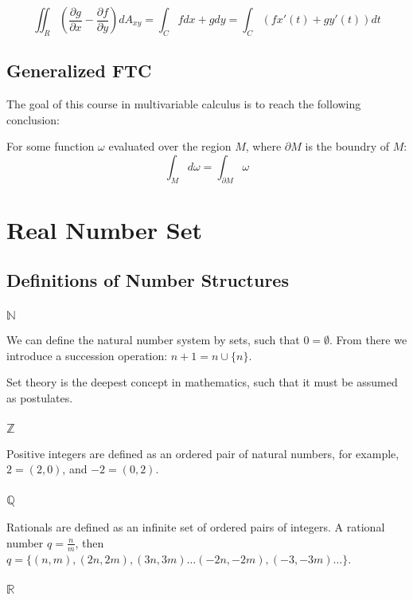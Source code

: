\documentclass[11 pt, twoside]{article}
\begin{document}
$$\iint_R (\frac{\partial g}{\partial x} - \frac{\partial f}{\partial y}) dA_{xy} =
\int_C fdx + gdy = \int_C (fx'(t) + gy'(t))dt$$

\subsection{Generalized FTC}

The goal of this course in multivariable calculus is to reach the following
conclusion:

For some function $\omega$ evaluated over the region $M$, where $\partial M$ is the boundry of $M$:
$$\int_M d\omega = \int_{\partial M} \omega$$

\section{Real Number Set}
\subsection{Definitions of Number Structures}
\subsubsection{$\mathbb{N}$}
We can define the natural number system by sets, such that $0 = \emptyset$.
From there we introduce a succession operation:
$n + 1 = n \cup \{n\}$.

\noindent Set theory is the deepest concept in mathematics, such that it must be assumed as postulates.

\subsubsection{$\mathbb{Z}$}
Positive integers are defined as an ordered pair of natural numbers, for
example, $2 = (2, 0)$, and $-2 = (0, 2)$.

\subsubsection{$\mathbb{Q}$}
Rationals are defined as an infinite set of ordered pairs of integers.
A rational number $q = \frac{n}{m}$, then $q = \{(n, m), (2n, 2m), (3n, 3m)
\dots (-2n, -2m), (-3, -3m) \dots\}$.

\subsubsection{$\mathbb{R}$}
\end{document}
